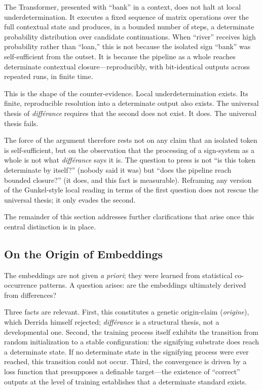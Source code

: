 \documentclass[a4paper,twocolumn,11pt]{article}
\begin{document}
The Transformer, presented with ``bank'' in a context, does not halt at local underdetermination. It executes a fixed sequence of matrix operations over the full contextual state and produces, in a bounded number of steps, a determinate probability distribution over candidate continuations. When ``river'' receives high probability rather than ``loan,'' this is not because the isolated sign ``bank'' was self-sufficient from the outset. It is because the pipeline as a whole reaches determinate contextual closure---reproducibly, with bit-identical outputs across repeated runs, in finite time.

This is the shape of the counter-evidence. Local underdetermination exists. Its finite, reproducible resolution into a determinate output also exists. The universal thesis of \emph{diff\'erance} requires that the second does not exist. It does. The universal thesis fails.

The force of the argument therefore rests not on any claim that an isolated token is self-sufficient, but on the observation that the processing of a sign-system as a whole is not what \emph{diff\'erance} says it is. The question to press is not ``is this token determinate by itself?'' (nobody said it was) but ``does the pipeline reach bounded closure?'' (it does, and this fact is measurable). Reframing any version of the Gunkel-style local reading in terms of the first question does not rescue the universal thesis; it only evades the second.

The remainder of this section addresses further clarifications that arise once this central distinction is in place.

\subsection{On the Origin of Embeddings}
\label{sec:origin}

The embeddings are not given \emph{a priori}; they were learned from statistical co-occurrence patterns. A question arises: are the embeddings ultimately derived from differences?

Three facts are relevant. First, this constitutes a genetic origin-claim (\emph{origine}), which Derrida himself rejected; \emph{diff\'erance} is a structural thesis, not a developmental one. Second, the training process itself exhibits the transition from random initialization to a stable configuration: the signifying substrate does reach a determinate state. If no determinate state in the signifying process were ever reached, this transition could not occur. Third, the convergence is driven by a loss function that presupposes a definable target---the existence of ``correct'' outputs at the level of training establishes that a determinate standard exists.
\end{document}
